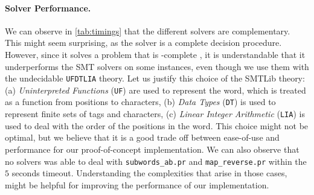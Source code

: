 \paragraph{Solver Performance.} We can observe in \cref{tab:timings} that the
different solvers are complementary. This might seem surprising, as the
 solver is a complete decision procedure. However, since it solves a
problem that is \TOWER-complete \cite[Theorem 13.5]{REINH02}, it is
understandable that it underperforms the SMT solvers on some instances, even
though we use them with the undecidable \texttt{UFDTLIA} theory. Let us justify
this choice of the SMTLib theory: (a) \emph{Uninterpreted Functions} (\texttt{UF}) are
used to represent the word, which is treated as a function from positions to
characters, (b) \emph{Data Types} (\texttt{DT}) is used to represent finite sets of tags
and characters, (c) \emph{Linear Integer Arithmetic} (\texttt{LIA}) is used to deal with
the order of the positions in the word. This choice might not be optimal, but
we believe that it is a good trade off between ease-of-use and performance for
our proof-of-concept implementation. We can also observe that no solvers was
able to deal with \texttt{subwords\_ab.pr} and \texttt{map\_reverse.pr} within
the $5$ seconds timeout. Understanding the complexities that arise in those
cases, might be helpful for improving the performance of our implementation.

